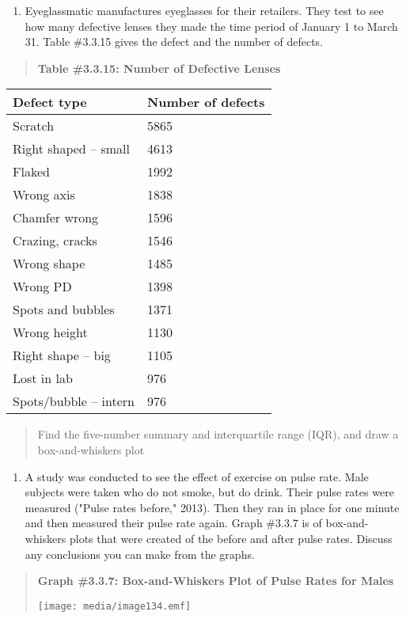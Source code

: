 \documentclass[]{book}
\providecommand{\tightlist}{%
  \setlength{\itemsep}{0pt}\setlength{\parskip}{0pt}}
\begin{document}
\begin{enumerate}
\def\labelenumi{\arabic{enumi}.}
\setcounter{enumi}{7}
\tightlist
\item
  Eyeglassmatic manufactures eyeglasses for their retailers. They test
  to see how many defective lenses they made the time period of
  January 1 to March 31. Table \#3.3.15 gives the defect and the
  number of defects.
\end{enumerate}

\begin{quote}
\textbf{Table \#3.3.15: Number of Defective Lenses}
\end{quote}

\begin{longtable}[]{@{}ll@{}}
\toprule
Defect type & Number of defects\tabularnewline
\midrule
\endhead
Scratch & 5865\tabularnewline
Right shaped -- small & 4613\tabularnewline
Flaked & 1992\tabularnewline
Wrong axis & 1838\tabularnewline
Chamfer wrong & 1596\tabularnewline
Crazing, cracks & 1546\tabularnewline
Wrong shape & 1485\tabularnewline
Wrong PD & 1398\tabularnewline
Spots and bubbles & 1371\tabularnewline
Wrong height & 1130\tabularnewline
Right shape -- big & 1105\tabularnewline
Lost in lab & 976\tabularnewline
Spots/bubble -- intern & 976\tabularnewline
\bottomrule
\end{longtable}

\begin{quote}
Find the five-number summary and interquartile range (IQR), and draw a
box-and-whiskers plot
\end{quote}

\begin{enumerate}
\def\labelenumi{\arabic{enumi}.}
\setcounter{enumi}{8}
\tightlist
\item
  A study was conducted to see the effect of exercise on pulse rate.
  Male subjects were taken who do not smoke, but do drink. Their pulse
  rates were measured ("Pulse rates before," 2013). Then they ran in
  place for one minute and then measured their pulse rate again. Graph
  \#3.3.7 is of box-and-whiskers plots that were created of the before
  and after pulse rates. Discuss any conclusions you can make from the
  graphs.
\end{enumerate}

\begin{quote}
\textbf{Graph \#3.3.7: Box-and-Whiskers Plot of Pulse Rates for Males}

\texttt{[image: media/image134.emf]}
\end{quote}
\end{document}
